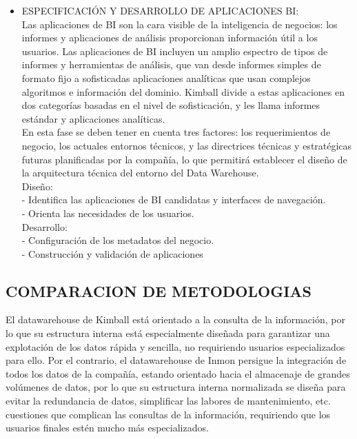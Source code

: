 \documentclass[preprint,12pt]{elsarticle}
\begin{document}
\begin{itemize}
				
				\item ESPECIFICACIÓN Y DESARROLLO DE APLICACIONES BI:  \\

Las aplicaciones de BI son la cara visible de la inteligencia de negocios: los informes y aplicaciones de análisis proporcionan información útil a los usuarios. Las aplicaciones de BI incluyen un amplio espectro de tipos de informes y herramientas de análisis, que van desde informes simples de formato fijo a sofisticadas aplicaciones analíticas que usan complejos algoritmos e información del dominio. Kimball divide a estas aplicaciones en dos categorías basadas en el nivel de sofisticación, y les llama informes estándar y aplicaciones analíticas.\\

En esta fase se deben tener en cuenta tres factores: los requerimientos de negocio, los actuales entornos técnicos, y las directrices técnicas y estratégicas futuras planificadas por la compañía, lo que permitirá establecer el diseño de la arquitectura técnica del entorno del Data Warehouse.\\

Diseño:\\

- Identifica las aplicaciones de BI candidatas y interfaces de navegación.\\
- Orienta las necesidades de los usuarios.\\

Desarrollo:\\

- Configuración de los metadatos del negocio.\\
- Construcción y validación de aplicaciones\\

			\end{itemize}




\subsection{COMPARACION DE METODOLOGIAS}	
El datawarehouse de Kimball está orientado a la consulta de la información, por lo que su estructura interna está especialmente diseñada para garantizar una explotación de los datos rápida y sencilla, no requiriendo usuarios especializados para ello. Por el contrario, el datawarehouse de Inmon persigue la integración de todos los datos de la compañía, estando orientado hacia el almacenaje de grandes volúmenes de datos, por lo que su estructura interna normalizada se diseña para evitar la redundancia de datos, simplificar las labores de mantenimiento, etc. cuestiones que complican las consultas de la información, requiriendo que los usuarios finales estén mucho más especializados.
\end{document}
